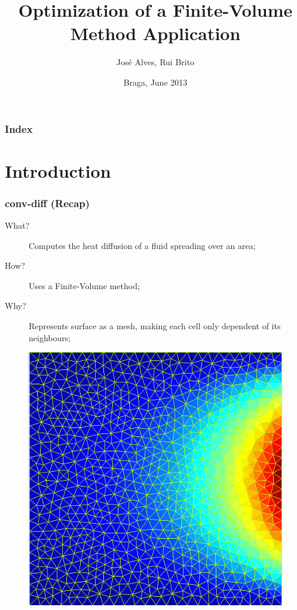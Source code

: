 \documentclass{beamer}
\title{Optimization of a Finite-Volume Method Application}
\author{José Alves, Rui Brito}
\institute[22765, 22781]{
	Universidade do Minho
}
\date{Braga, June 2013}
\begin{document}

\maketitle%

\begin{frame}
	\frametitle{Index}
	\tableofcontents
\end{frame}

\section{Introduction}
\begin{frame}
	\frametitle{conv-diff (Recap)}
	\begin{description}
		\item [What?] Computes the heat diffusion of a fluid spreading over an area;
		\item [How?] Uses a Finite-Volume method;
		\item [Why?] Represents surface as a mesh, making each cell only dependent of its neighbours;
	\end{description}
\end{frame}

\begin{frame}
	\begin{figure}[!htp]
    	\centering   
        \includegraphics[width=.6\textwidth]{../images/mesh.png}        
	\end{figure}
\end{frame}
\end{document}
